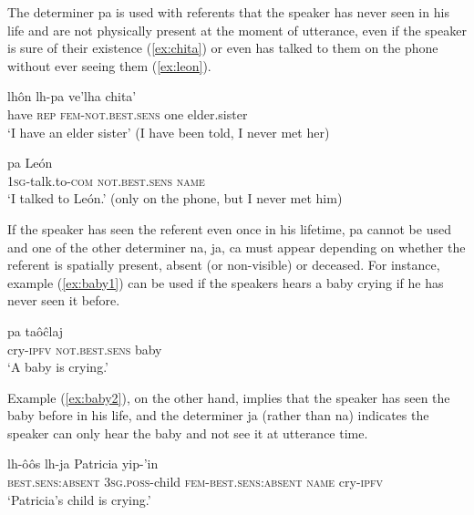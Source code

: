 \documentclass[oneside,a4paper,11pt]{article}
\newcommand{\ipa}[1]{{\phon \mbox{#1}}} %
\begin{document}
  The determiner \ipa{pa} is used with referents that the speaker has never seen in his life and are not physically present at the moment of utterance, even if the speaker is sure of their existence (\ref{ex:chita}) or even has talked to them on the phone without ever seeing them (\ref{ex:leon}).
  
  \begin{exe}
\ex \label{ex:chita}
\gll   \ipa{caaj}  \ipa{lhôn}  \ipa{lh-pa}  \ipa{ve'lha}  \ipa{chita'} \\
have \textsc{rep} \textsc{fem-not.best.sens} one elder.sister \\
\glt `I have an elder sister' (I have been told, I never met her)
\end{exe}


\begin{exe}
\ex  \label{ex:leon}
\gll \ipa{ja-yasinôy-esh} \ipa{pa}  \ipa{León} \\
\textsc{1sg}-talk.to-\textsc{com} \textsc{not.best.sens} \textsc{name} \\
\glt  `I talked to León.' (only on the phone, but I never met him)
\end{exe}

If the speaker has seen the referent even once in his lifetime, \ipa{pa} cannot be used and one of the other determiner \ipa{na}, \ipa{ja}, \ipa{ca} must appear  depending on whether the referent is  spatially present, absent (or non-visible) or deceased. For instance, example (\ref{ex:baby1}) can be used if the speakers hears a baby crying if he has never seen it before.

\begin{exe}
\ex  \label{ex:baby1}
\gll   \ipa{yip-'in}  \ipa{pa} \ipa{taôĉlaj} \\
cry-\textsc{ipfv} \textsc{not.best.sens} baby \\
\glt  `A baby is crying.'
\end{exe}

Example (\ref{ex:baby2}), on the other hand, implies that the speaker has seen the baby before in his life, and the determiner  \ipa{ja} (rather than \ipa{na}) indicates the speaker can only hear the baby and not see it at utterance time.

\begin{exe}
\ex  \label{ex:baby2}
\gll    \ipa{ja} \ipa{lh-ôôs} \ipa{lh-ja} \ipa{Patricia} \ipa{yip-'in} \\
\textsc{best.sens:absent} \textsc{3sg.poss}-child \textsc{fem-best.sens:absent}
\textsc{name} cry-\textsc{ipfv}  \\
\glt  `Patricia's child is crying.'
\end{exe}
\end{document}
